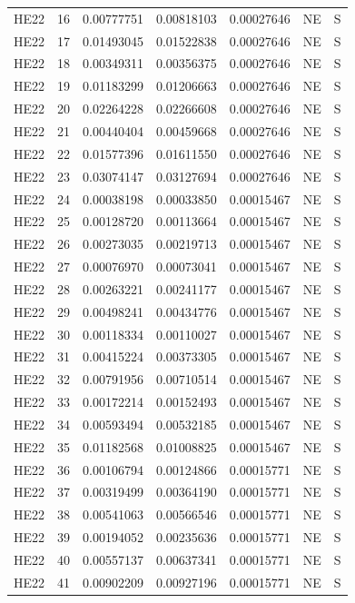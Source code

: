 \documentclass[11pt]{article}
\begin{document}
{\begin{longtable}{llrrrll}
HE22 & 16 & 0.00777751 & 0.00818103 & 0.00027646 & NE & S\\
HE22 & 17 & 0.01493045 & 0.01522838 & 0.00027646 & NE & S\\
HE22 & 18 & 0.00349311 & 0.00356375 & 0.00027646 & NE & S\\
HE22 & 19 & 0.01183299 & 0.01206663 & 0.00027646 & NE & S\\
HE22 & 20 & 0.02264228 & 0.02266608 & 0.00027646 & NE & S\\
HE22 & 21 & 0.00440404 & 0.00459668 & 0.00027646 & NE & S\\
HE22 & 22 & 0.01577396 & 0.01611550 & 0.00027646 & NE & S\\
HE22 & 23 & 0.03074147 & 0.03127694 & 0.00027646 & NE & S\\
HE22 & 24 & 0.00038198 & 0.00033850 & 0.00015467 & NE & S\\
HE22 & 25 & 0.00128720 & 0.00113664 & 0.00015467 & NE & S\\
HE22 & 26 & 0.00273035 & 0.00219713 & 0.00015467 & NE & S\\
HE22 & 27 & 0.00076970 & 0.00073041 & 0.00015467 & NE & S\\
HE22 & 28 & 0.00263221 & 0.00241177 & 0.00015467 & NE & S\\
HE22 & 29 & 0.00498241 & 0.00434776 & 0.00015467 & NE & S\\
HE22 & 30 & 0.00118334 & 0.00110027 & 0.00015467 & NE & S\\
HE22 & 31 & 0.00415224 & 0.00373305 & 0.00015467 & NE & S\\
HE22 & 32 & 0.00791956 & 0.00710514 & 0.00015467 & NE & S\\
HE22 & 33 & 0.00172214 & 0.00152493 & 0.00015467 & NE & S\\
HE22 & 34 & 0.00593494 & 0.00532185 & 0.00015467 & NE & S\\
HE22 & 35 & 0.01182568 & 0.01008825 & 0.00015467 & NE & S\\
HE22 & 36 & 0.00106794 & 0.00124866 & 0.00015771 & NE & S\\
HE22 & 37 & 0.00319499 & 0.00364190 & 0.00015771 & NE & S\\
HE22 & 38 & 0.00541063 & 0.00566546 & 0.00015771 & NE & S\\
HE22 & 39 & 0.00194052 & 0.00235636 & 0.00015771 & NE & S\\
HE22 & 40 & 0.00557137 & 0.00637341 & 0.00015771 & NE & S\\
HE22 & 41 & 0.00902209 & 0.00927196 & 0.00015771 & NE & S\\

\end{longtable}}
\end{document}
